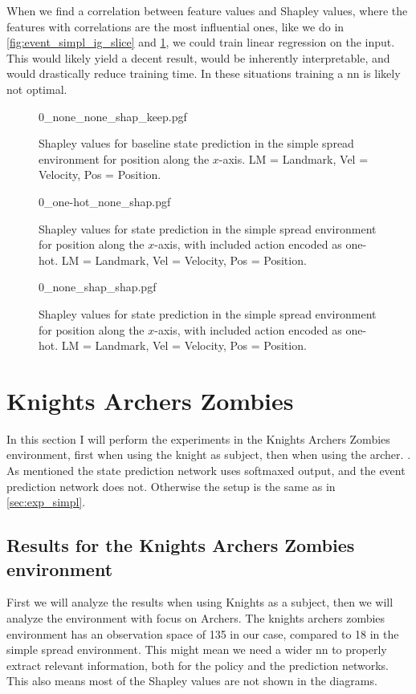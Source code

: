 \documentclass[UKenglish]{uiomasterthesis}
\begin{document}
When we find a correlation between feature values and Shapley values, where the features with correlations are the most influential ones, like we do in \cref{fig:event_simpl_ig_slice} and \cref{fig:state_simpl_shap}, we could train linear regression on the input. This would likely yield a decent result, would be inherently interpretable, and would drastically reduce training time. In these situations training a \ac{nn} is likely not optimal.

\begin{figure}[H]
    \centering
{0_none_none_shap_keep.pgf}
\caption{Shapley values for baseline state prediction in the simple spread environment for position along the $x$-axis. LM = Landmark, Vel = Velocity, Pos = Position.}
\label{fig:state_simpl_shap}
\end{figure}

\begin{figure}[H]
\centering
{0_one-hot_none_shap.pgf}
\caption{Shapley values for state prediction in the simple spread environment for position along the $x$-axis, with included action encoded as one-hot. LM = Landmark, Vel = Velocity, Pos = Position.}
\label{fig:state_simpl_one-hot}
\end{figure}

\begin{figure}[H]
\centering
{0_none_shap_shap.pgf}
\caption{Shapley values for state prediction in the simple spread environment for position along the $x$-axis, with included action encoded as one-hot. LM = Landmark, Vel = Velocity, Pos = Position.}
\label{fig:state_simpl_shap_shap}
\end{figure}

\section{Knights Archers Zombies}
In this section I will perform the experiments in the Knights Archers Zombies environment, first when using the knight as subject, then when using the archer.
\label{sec:exp_kaz}. As mentioned the state prediction network uses softmaxed output, and the event prediction network does not. Otherwise the setup is the same as in \cref{sec:exp_simpl}.

\subsection{Results for the Knights Archers Zombies environment}
First we will analyze the results when using Knights as a subject, then we will analyze the environment with focus on Archers. The knights archers zombies environment has an observation space of 135 in our case, compared to 18 in the simple spread environment. This might mean we need a wider \ac{nn} to properly extract relevant information, both for the policy and the prediction networks. This also means most of the Shapley values are not shown in the diagrams.
\end{document}
